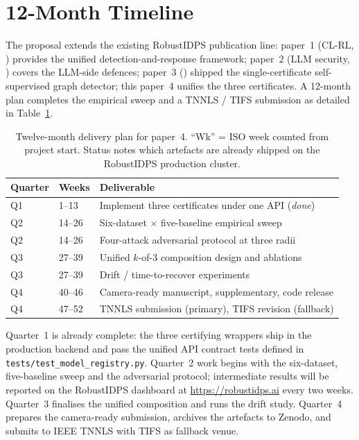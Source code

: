 \documentclass[journal,twoside]{IEEEtran}
\begin{document}
\section{12-Month Timeline}\label{sec:timeline}

The proposal extends the existing RobustIDPS publication line:
paper~1 (CL-RL, \cite{anaedevha2024surrogate}) provides the unified
detection-and-response framework; paper~2 (LLM security,
\cite{anaedevha2025llmsec}) covers the LLM-side defences; paper~3
(\cite{anaedevha2026sslgraph}) shipped the single-certificate
self-supervised graph detector; this paper~4 unifies the three
certificates. A 12-month plan completes the empirical sweep and a
TNNLS / TIFS submission as detailed in Table~\ref{tab:timeline}.

\begin{table}[t]
\centering
\caption{Twelve-month delivery plan for paper~4. ``Wk'' = ISO week
counted from project start. Status notes which artefacts are already
shipped on the RobustIDPS production cluster.}
\label{tab:timeline}
\small
\begin{tabular}{lll}
\toprule
Quarter & Weeks & Deliverable \\
\midrule
Q1 & 1--13   & Implement three certificates under one API (\emph{done}) \\
Q2 & 14--26  & Six-dataset $\times$ five-baseline empirical sweep \\
Q2 & 14--26  & Four-attack adversarial protocol at three radii \\
Q3 & 27--39  & Unified $k$-of-$3$ composition design and ablations \\
Q3 & 27--39  & Drift / time-to-recover experiments \\
Q4 & 40--46  & Camera-ready manuscript, supplementary, code release \\
Q4 & 47--52  & TNNLS submission (primary), TIFS revision (fallback) \\
\bottomrule
\end{tabular}
\end{table}

Quarter~1 is already complete: the three certifying wrappers ship in
the production backend and pass the unified API contract tests defined
in \texttt{tests/test\_model\_registry.py}. Quarter~2 work begins with
the six-dataset, five-baseline sweep and the adversarial protocol;
intermediate results will be reported on the RobustIDPS dashboard at
\url{https://robustidps.ai} every two weeks. Quarter~3 finalises the
unified composition and runs the drift study. Quarter~4 prepares the
camera-ready submission, archives the artefacts to Zenodo, and submits
to IEEE TNNLS with TIFS as fallback venue.
\end{document}
